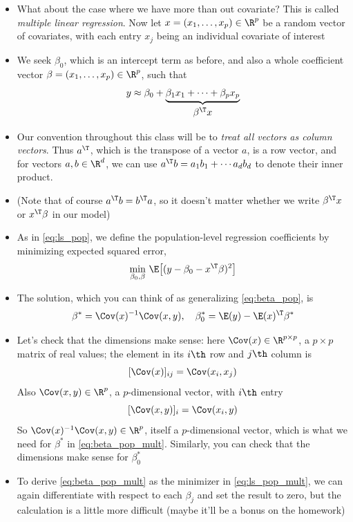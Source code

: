 \documentclass{article}
\begin{document}
\begin{itemize}
\item What about the case where we have more than out covariate? This is called
  \emph{multiple linear regression}. Now let $x = (x_1, \dots, x_p) \in \R^p$
  be a random vector of covariates, with each entry $x_j$ being an individual
  covariate of interest

\item We seek $\beta_0$, which is an intercept term as before, and also a whole 
  coefficient vector $\beta = (x_1, \dots, x_p) \in \R^p$, such that 
  \[
  y \approx \beta_0 + \underbrace{\beta_1 x_1 + \cdots + \beta_p
    x_p}_{\textstyle \begin{array}{c} \beta^\T x \end{array}}
  \]

\item Our convention throughout this class will be to \emph{treat all vectors as 
    column vectors}. Thus $a^\T$, which is the transpose of a vector $a$, is a
  row vector, and for vectors $a,b \in \R^d$, we can use $a^\T b = a_1 b_1 +
  \cdots a_d b_d$ to denote their inner product. 

\item (Note that of course $a^\T b = b^\T a$, so it doesn't matter whether we
  write $\beta^\T x$ or $x^\T \beta$ in our model)

\item As in \eqref{eq:ls_pop}, we define the population-level regression
  coefficients by minimizing expected squared error,   
  \begin{equation}
  \label{eq:ls_pop_mult}
  \min_{\beta_0, \beta} \, \E\big[ (y - \beta_0 - x^\T \beta)^2 \big]
  \end{equation}

\item The solution, which you can think of as generalizing \eqref{eq:beta_pop},
  is 
  \begin{equation}
  \label{eq:beta_pop_mult}
  \beta^* = \Cov(x)^{-1} \Cov(x, y), \quad 
  \beta^*_0 = \E(y) - \E(x)^\T \beta^*
  \end{equation}

\item Let's check that the dimensions make sense: here $\Cov(x) \in \R^{p
    \times  p}$, a $p \times p$ matrix of real values; the element in its $i\th$
  row and $j\th$ column is   
  \[
  [\Cov(x)]_{ij} = \Cov(x_i, x_j)
  \]
  Also $\Cov(x, y) \in \R^p$, a $p$-dimensional vector, with $i\th$ entry
  \[
  [\Cov(x, y)]_i = \Cov(x_i, y)
  \]
  So $\Cov(x)^{-1} \Cov(x, y) \in \R^p$, itself a $p$-dimensional vector, which
  is what we need for $\beta^*$ in \eqref{eq:beta_pop_mult}. Similarly, you can
  check that the dimensions make sense for $\beta^*_0$ 

\item To derive \eqref{eq:beta_pop_mult} as the minimizer in
  \eqref{eq:ls_pop_mult}, we can again differentiate with respect to each
  $\beta_j$ and set the result to zero, but the calculation is a little more
  difficult (maybe it'll be a bonus on the homework) 
\end{itemize}
\end{document}
